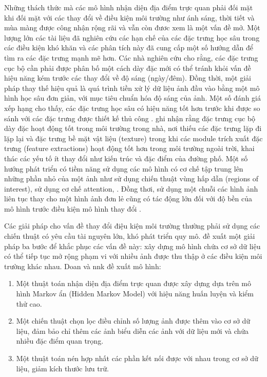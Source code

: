Những thách thức mà các mô hình nhận diện địa điểm trực quan phải đối mặt khi đối mặt với các thay đổi về điều kiện môi trường như ánh sáng, thời tiết và mùa màng được công nhận rộng rãi \cite{zaffar2019levelling} và vẫn còn đươc xem là một vấn đề mở. Một lượng lớn các tài liệu đã nghiên cứu các hạn chế của các đặc trưng học sâu trong các điều kiện khó khăn \cite{zhou2016evaluating, sunderhauf2015performance, chen2017deep} và các phân tích này đã cung cấp một số hướng dẫn để tìm ra các đặc trưng mạnh mẽ hơn. Các nhà nghiên cứu cho rằng, các đặc trưng cục bộ cần phải được phân bố một cách dày đặc mới có thể tránh khỏi vấn đề hiệu năng kém trước các thay đổi về độ sáng (ngày/đêm). Đồng thời, một giải pháp thay thế hiệu quả là quá trình tiền xử lý dữ liệu ảnh đầu vào bằng một mô hình học sâu đơn giản, với mục tiêu chuẩn hóa độ sáng của ảnh. Một số đánh giá xếp hạng cho thấy, các đặc trưng học sâu có hiệu năng tốt hơn trước khi được so sánh với các đặc trưng được thiết kế thủ công \cite{arandjelovic2017netvlad}. \cite{taira2018inloc} ghi nhận rằng đặc trưng cục bộ dày đặc hoạt động tốt trong môi trường trong nhà, nơi thiếu các đặc trưng lặp đi lặp lại và đặc trưng bề mặt vật liệu (texture) trong khi các module trích xuất đặc trưng (feature extractions) hoạt động tốt hơn trong môi trường ngoài trời, khai thác các yếu tố ít thay đổi như kiến trúc và đặc điểm của đường phố. Một số hướng phát triển có tiềm năng sử dụng các mô hình có cơ chế tập trung lên những phần nhỏ của một ảnh như \cite{sunderhauf2015place, chen2017only, khaliq2019holistic} sử dụng chiến thuật vùng hấp dẫn (regions of interest), \cite{zhu2018attention, chen2017only, khaliq2019holistic, wang2019atloc, wang2022transvpr, alibey2023mixvpr} sử dụng cơ chế attention, \cite{garg2018lost, naseer2017semantics, seymour2019semantically}. Đồng thơi, sử dụng một chuỗi các hình ảnh liên tục thay cho một hình ảnh đơn lẻ cũng có tác động lớn đối với độ bền của mô hình trước điều kiện mô hình thay đổi \cite{naseer2018robust, hausler2019multi, hong2019textplace, chancan2020hybrid}.

Các giải pháp cho vấn đề thay đổi điệu kiện môi trường thường phải sử dụng các chiến thuật có yêu cầu tài nguyên lớn, khó phát triển quy mô. \cite{doan2019scalable} đề xuất một giải pháp ba bước để khắc phục các vấn đề này: xây dựng mô hình chứa cơ sở dữ liệu có thể tiếp tục mở rộng phạm vi với nhiều ảnh được thu thập ở các điều kiện môi trường khác nhau. Doan và nnk đề xuất mô hình:

\begin{enumerate}
    \item Một thuật toán nhận diện địa điểm trực quan được xây dựng dựa trên mô hình Markov ẩn (Hidden Markov Model) với hiệu năng huấn luyện và kiểm thử cao.
    \item Một chiến thuật chọn lọc điều chỉnh số lượng ảnh được thêm vào cơ sở dữ liệu, đảm bảo chỉ thêm các ảnh biểu diễn các ảnh với dữ liệu mới và chứa nhiều đặc điểm quan trọng.
    \item Một thuật toán nén hợp nhất các phần kết nối được với nhau trong cơ sở dữ liệu, giảm kích thước lưu trữ.
\end{enumerate}

